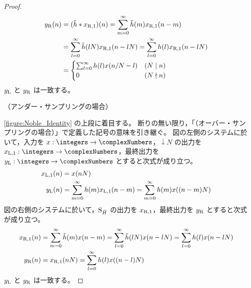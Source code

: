 \begin{proof}
\begin{align*}
                y_{\mathrm{R}}(n) &= (\tilde{h}*x_{\mathrm{R},1})(n) = \sum_{m=0}^\infty \tilde{h}(m)x_{\mathrm{R},1}(n-m) \\
                &= \sum_{l=0}^\infty \tilde{h}(lN)x_{\mathrm{R},1}(n-lN) = \sum_{l=0}^\infty h(l)x_{\mathrm{R},1}(n-lN) \\
                &= \begin{cases}
                    \sum_{l=0}^\infty h(l)x(n/N-l) & (N\mid n) \\
                    0 & (N\nmid n)
                \end{cases}
            \end{align*}
            $y_{\mathrm{L}}$ と $y_{\mathrm{R}}$ は一致する。
            \newline
            \quad\par\noindent
            （アンダー・サンプリングの場合）
            \par\noindent
            \cref{figure:Noble_Identity} の上段に着目する。
            断りの無い限り，「（オーバー・サンプリングの場合）」で定義した記号の意味を引き継ぐ。
            図の左側のシステムに於いて，入力を $x:\integers\to\complexNumbers$，$\downarrow N$ の出力を $\xLone:\integers\to\complexNumbers$，最終出力を $\yL:\integers\to\complexNumbers$ とすると次式が成り立つ。
            \begin{align*}
                x_{\mathrm{L},1}(n) &= x(nN) \\
                y_{\mathrm{L}}(n) &= \sum_{m=0}^\infty h(m)x_{\mathrm{L},1}(n-m) = \sum_{m=0}^\infty h(m)x((n-m)N)
            \end{align*}
            図の右側のシステムに於いて，$\mathrm{S}_{\tilde{H}}$ の出力を $x_{\mathrm{R},1}$，最終出力を $y_{\mathrm{R}}$ とすると次式が成り立つ。
            \begin{align*}
                x_{\mathrm{R},1}(n) &= \sum_{m=0}^\infty \tilde{h}(m)x(n-m) = \sum_{l=0}^\infty \tilde{h}(lN)x(n-lN) = \sum_{l=0}^\infty h(l)x(n-lN) \\
                y_{\mathrm{R}}(n) &= x_{\mathrm{R},1}(nN) = \sum_{l=0}^\infty h(l)x((n-l)N)
            \end{align*}
            $y_{\mathrm{L}}$ と $y_{\mathrm{R}}$ は一致する。
        \end{proof}
